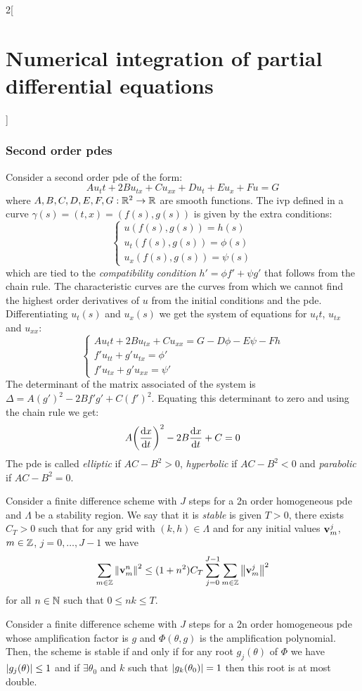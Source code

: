 \documentclass[../../../main_math.tex]{subfiles}
\begin{document}
\begin{multicols}{2}[\section{Numerical integration of partial differential equations}]
  \subsubsection{Second order pdes}
  \begin{definition}
    Consider a second order pde of the form:
    \begin{equation}
      A u_tt+2Bu_{tx} +Cu_{xx}+Du_t+Eu_x+F u=G
    \end{equation}
    where $A,B,C,D,E,F,G:\mathbb{R}^2\rightarrow\mathbb{R}$ are smooth functions. The ivp defined in a curve $\gamma(s)=(t,x)=(f(s),g(s))$ is given by the extra conditions:
    $$
      \begin{cases}
        u(f(s),g(s))=h(s)      \\
        u_t(f(s),g(s))=\phi(s) \\
        u_x(f(s),g(s))=\psi(s)
      \end{cases}
    $$
    which are tied to the \emph{compatibility condition} $h'=\phi f'+\psi g'$ that follows from the chain rule. The characteristic curves are the curves from which we cannot find the highest order derivatives of $u$ from the initial conditions and the pde. Differentiating $u_t(s)$ and $u_x(s)$ we get the system of equations for $u_tt$, $u_{tx}$ and $u_{xx}$:
    \begin{equation*}
      \begin{cases}
        A u_tt+2Bu_{tx} +Cu_{xx}=G-D\phi-E\psi -Fh \\
        f'u_{tt}+g'u_{tx}=\phi'                    \\
        f'u_{tx}+g'u_{xx}=\psi'
      \end{cases}
    \end{equation*}
    The determinant of the matrix associated of the system is $\Delta=A{(g')}^2-2Bf'g'+C{(f')}^2$. Equating this determinant to zero and using the chain rule we get:
    $$
      A{\left(\dv{x}{t}\right)}^2-2B\dv{x}{t}+C=0
    $$
    The pde is called \emph{elliptic} if $AC-B^2>0$, \emph{hyperbolic} if $AC-B^2<0$ and \emph{parabolic} if $AC-B^2=0$.
  \end{definition}
  \begin{definition}
    Consider a finite difference scheme with $J$ steps for a 2n order homogeneous pde and $\Lambda$ be a stability region. We say that it is \emph{stable} is given $T>0$, there exists $C_T>0$ such that for any grid with $(k,h)\in \Lambda$ and for any initial values $\boldsymbol{\mathrm{v}}_m^j$, $m\in\mathbb{Z}$, $j=0,\ldots,J-1$ we have $$\sum_{m\in\mathbb{Z}}\left\|\boldsymbol{\mathrm{v}}_m^n\right\|^2\leq (1+n^2)C_T\sum_{j=0}^{J-1}\sum_{m\in\mathbb{Z}}\left\|\boldsymbol{\mathrm{v}}_m^j\right\|^2$$ for all $n\in\mathbb{N}$ such that $0\leq nk\leq T$.
  \end{definition}
  \begin{theorem}
    Consider a finite difference scheme with $J$ steps for a 2n order homogeneous pde whose amplification factor is $g$ and $\Phi(\theta, g)$ is the amplification polynomial. Then, the scheme is stable if and only if for any root $g_j(\theta)$ of $\Phi$ we have $\abs{g_j(\theta)}\leq 1$ and if $\exists \theta_0$ and $k$ such that $\abs{g_k(\theta_0)}=1$ then this root is at most double.
  \end{theorem}

\end{multicols}
\end{document}

